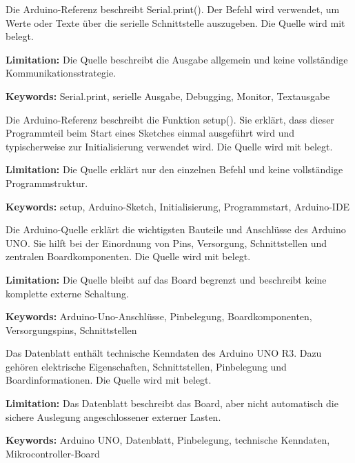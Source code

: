 
{ 
	Die Arduino-Referenz beschreibt Serial.print(). Der Befehl wird verwendet, um Werte oder Texte über die serielle Schnittstelle auszugeben. Die Quelle wird mit \cite{arduino_serialprint} belegt.
	
	\bigskip
	
	\textbf{Limitation:} Die Quelle beschreibt die Ausgabe allgemein und keine vollständige Kommunikationsstrategie.
	
	\scriptsize{\textbf{Keywords:} Serial.print, serielle Ausgabe, Debugging, Monitor, Textausgabe}
}



{ 
	Die Arduino-Referenz beschreibt die Funktion setup(). Sie erklärt, dass dieser Programmteil beim Start eines Sketches einmal ausgeführt wird und typischerweise zur Initialisierung verwendet wird. Die Quelle wird mit \cite{arduino_setup} belegt.
	
	\bigskip
	
	\textbf{Limitation:} Die Quelle erklärt nur den einzelnen Befehl und keine vollständige Programmstruktur.
	
	\scriptsize{\textbf{Keywords:} setup, Arduino-Sketch, Initialisierung, Programmstart, Arduino-IDE}
}



{ 
	Die Arduino-Quelle erklärt die wichtigsten Bauteile und Anschlüsse des Arduino UNO. Sie hilft bei der Einordnung von Pins, Versorgung, Schnittstellen und zentralen Boardkomponenten. Die Quelle wird mit \cite{arduino:uno-components} belegt.
	
	\bigskip
	
	\textbf{Limitation:} Die Quelle bleibt auf das Board begrenzt und beschreibt keine komplette externe Schaltung.
	
	\scriptsize{\textbf{Keywords:} Arduino-Uno-Anschlüsse, Pinbelegung, Boardkomponenten, Versorgungspins, Schnittstellen}
}



{ 
	Das Datenblatt enthält technische Kenndaten des Arduino UNO R3. Dazu gehören elektrische Eigenschaften, Schnittstellen, Pinbelegung und Boardinformationen. Die Quelle wird mit \cite{arduino:uno-datasheet} belegt.
	
	\bigskip
	
	\textbf{Limitation:} Das Datenblatt beschreibt das Board, aber nicht automatisch die sichere Auslegung angeschlossener externer Lasten.
	
	\scriptsize{\textbf{Keywords:} Arduino UNO, Datenblatt, Pinbelegung, technische Kenndaten, Mikrocontroller-Board}
}


